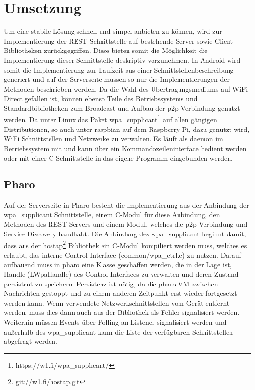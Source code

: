 \section{Umsetzung}
	Um eine stabile Lösung schnell und simpel anbieten zu können, wird zur Implementierung der REST-Schnittstelle auf bestehende Server sowie Client Bibliotheken zurückgegriffen. Diese bieten somit die Möglichkeit die Implementierung dieser Schnittstelle deskriptiv vorzunehmen. In Android wird somit die Implementierung zur Laufzeit aus einer Schnittstellenbeschreibung generiert und auf der Serverseite müssen so nur die Implementierungen der Methoden beschrieben werden. Da die Wahl des Übertragungsmediums auf WiFi-Direct gefallen ist, können ebenso Teile des Betriebssystems und Standardbibliotheken zum Broadcast und Aufbau der p2p Verbindung genutzt werden.
	Da unter Linux das Paket wpa\_supplicant\footnote{https://w1.fi/wpa\_supplicant/} auf allen gängigen Distributionen, so auch unter raspbian auf dem Raspberry Pi, dazu genutzt wird, WiFi Schnittstellen und Netzwerke zu verwalten. Es läuft als daemon im Betriebssystem mit und kann über ein Kommandozeileninterface bedient werden oder mit einer C-Schnittstelle in das eigene Programm eingebunden werden.
	\subsection{Pharo}
		Auf der Serverseite in Pharo besteht die Implementierung aus der Anbindung der wpa\_supplicant Schnittstelle, einem C-Modul für diese Anbindung, den Methoden des REST-Servers und einem Modul, welches die p2p Verbindung und Service Discovery handhabt.
		Die Anbindung des wpa\_supplicant beginnt damit, dass aus der hostap\footnote{git://w1.fi/hostap.git} Bibliothek ein C-Modul kompiliert werden muss, welches es erlaubt, das interne Control Interface (common/wpa\_ctrl.c) zu nutzen. Darauf aufbauend muss in pharo eine Klasse geschaffen werden, die in der Lage ist, Handle (LWpaHandle) des Control Interfaces zu verwalten und deren Zustand persistent zu speichern. Persistenz ist nötig, da die pharo-VM zwischen Nachrichten gestoppt und zu einem anderen Zeitpunkt erst wieder fortgesetzt werden kann. Wenn verwendete Netzwerkschnittstellen vom Gerät entfernt werden, muss dies dann auch aus der Bibliothek als Fehler signalisiert werden. Weiterhin müssen Events über Polling an Listener signalisiert werden und außerhalb des wpa\_supplicant kann die Liste der verfügbaren Schnittstellen abgefragt werden.
		
